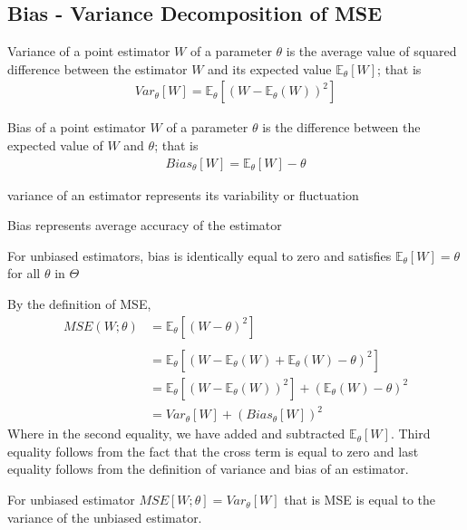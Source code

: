 \documentclass[a4paper,english,12pt]{article}
\begin{document}
\subsection{Bias - Variance Decomposition of MSE}
\begin{defn}
Variance of a point estimator $W$ of a parameter $\theta$ is the average value of squared difference between the estimator $W$ and its expected value $\mathbb{E}_\theta[W]$; that is 
\begin{align*}
Var_\theta[W]  = \mathbb{E}_\theta[(W - \mathbb{E}_\theta(W))^2]
\end{align*} 
\end{defn}
\begin{defn}
Bias of a point estimator $W$ of a parameter $\theta$ is the difference between the expected value of $W$ and $\theta$; that is 
\begin{align*}
Bias_\theta[W] = \mathbb{E}_\theta[W] - \theta
\end{align*}
\end{defn} 
\begin{rem}
variance of an estimator represents its variability or fluctuation\\
\end{rem}
\begin{rem}
Bias represents average accuracy of the estimator
\end{rem}
\begin{rem}
For unbiased estimators, bias is identically equal to zero and satisfies $ \mathbb{E}_\theta[W] = \theta$ for all $\theta$ in $\Theta$ 
\end{rem}
By the definition of MSE,
\begin{align*}
MSE(W ; \theta) &= \mathbb{E}_\theta[(W - \theta)^2]\\\\
&= \mathbb{E}_\theta[(W - \mathbb{E}_\theta(W) + \mathbb{E}_\theta(W) - \theta)^2]\\
&= \mathbb{E}_\theta[(W - \mathbb{E}_\theta(W))^2] + (\mathbb{E}_\theta(W) - \theta)^2\\
&= Var_\theta[W] + (Bias_\theta[W])^2
\end{align*} 
Where in the second equality, we have added and subtracted $\mathbb{E}_\theta[W]$. Third equality follows from the fact that the cross term is equal to zero and last equality follows from the definition of variance and bias of an estimator.
\begin{rem}
For unbiased estimator $MSE[W;\theta] = Var_\theta[W]$ that is MSE is equal to the variance of the unbiased estimator.
\end{rem}
\end{document}
